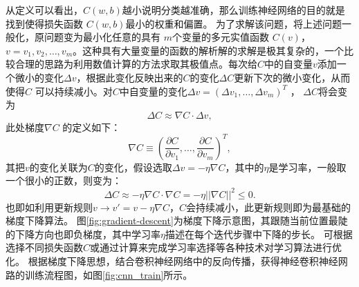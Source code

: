 从定义可以看出，$C(w,b) $越小说明分类越准确，那么训练神经网络的目的就是找到使得损失函数 $C(w,b)$最小的权重和偏置。
为了求解该问题，将上述问题一般化，原问题变为最小化任意的具有 $m $个变量的多元实值函数 $C(v) $， $v=v_1,v_2,\dots,v_m $。这种具有大量变量的函数的解析解的求解是极其复杂的，一个比较合理的思路为利用数值计算的方法求取其极值点。每次给$C $中的自变量$v$添加一个微小的变化$\Delta v $，根据此变化反映出来的$C $的变化$\Delta C $更新下次的微小变化，从而使得$C $ 可以持续减小。对$C $中自变量的变化$\Delta v=(\Delta v_1,\dots,\Delta v_m)^T $ ， $\Delta C $将会变为
\begin{equation}
\Delta C \approx \nabla C \cdot \Delta v,
    \label{equ:gradient1}
\end{equation}
此处梯度$\nabla C $ 的定义如下：
\begin{equation}
\nabla C \equiv (\frac{\partial C}{\partial v_1},\dots,\frac{\partial C}{\partial v_m})^T,
\end{equation}
其把$v$的变化关联为$C$的变化，假设选取$\Delta v=-\eta \nabla C $，其中的$\eta $是学习率，一般取一个很小的正数，则变为：
\begin{equation}
\Delta C \approx -\eta\nabla C\cdot\nabla C=-\eta||\nabla C||^2 \leq 0.
\end{equation}
也即如利用更新规则$v \rightarrow v'=v-\eta \nabla C$，$C$会持续减小，此更新规则即为最基础的梯度下降算法。
图\ref{fig:gradient-descent}为梯度下降示意图，其跟随当前位置最陡的下降方向也即负梯度，其中学习率$\eta $描述在每个迭代步骤中下降的步长。
可根据选择不同损失函数$C$或通过计算来完成学习率选择等各种技术对学习算法进行优化。
根据梯度下降思想，结合卷积神经网络中的反向传播，获得神经卷积神经网路的训练流程图，如图\ref{fig:cnn_train}所示。


